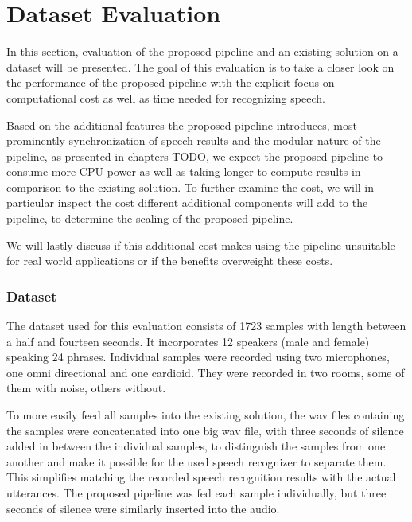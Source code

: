 

\section{Dataset Evaluation}

In this section, evaluation of the proposed pipeline and an existing solution on a dataset will be presented.
The goal of this evaluation is to take a closer look on the performance of the proposed pipeline with the explicit focus on computational cost as well as time needed for recognizing speech.

Based on the additional features the proposed pipeline introduces, most prominently synchronization of speech results and the modular nature of the pipeline, as presented in chapters TODO, we expect the proposed pipeline to consume more CPU power as well as taking longer to compute results in comparison to the existing solution.
To further examine the cost, we will in particular inspect the cost different additional components will add to the pipeline, to determine the scaling of the proposed pipeline.

We will lastly discuss if this additional cost makes using the pipeline unsuitable for real world applications or if the benefits overweight these costs.

\subsubsection{Dataset}

The dataset used for this evaluation consists of 1723 samples with length between a half and fourteen seconds.
It incorporates 12 speakers (male and female) speaking 24 phrases. 
Individual samples were recorded using two microphones, one omni directional and one cardioid.
They were recorded in two rooms, some of them with noise, others without.

To more easily feed all samples into the existing solution, the wav files containing the samples were concatenated into one big wav file, with three seconds of silence added in between the individual samples, to distinguish the samples from one another and make it possible for the used speech recognizer to separate them.
This simplifies matching the recorded speech recognition results with the actual utterances.
The proposed pipeline was fed each sample individually, but three seconds of silence were similarly inserted into the audio.


